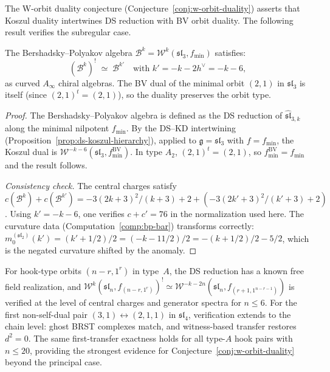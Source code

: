 The W-orbit duality conjecture (Conjecture~\ref{conj:w-orbit-duality})
asserts that Koszul duality intertwines DS reduction with BV orbit duality.
The following result verifies the subregular case.

\begin{proposition}
\label{prop:bp-duality}
The Bershadsky--Polyakov algebra
$\mathcal{B}^k = \mathcal{W}^k(\mathfrak{sl}_3, f_{\min})$
satisfies:
\begin{equation}\label{eq:bp-duality}
(\mathcal{B}^k)^! \;\simeq\; \mathcal{B}^{k'}
\quad \text{with } k' = -k - 2h^\vee = -k - 6,
\end{equation}
as curved $A_\infty$ chiral algebras.  The BV dual of the minimal orbit
$(2,1)$ in $\mathfrak{sl}_3$ is itself (since $(2,1)^t = (2,1)$), so
the duality preserves the orbit type.
\end{proposition}

\begin{proof}
The Bershadsky--Polyakov algebra is defined as the DS reduction of
$\widehat{\mathfrak{sl}}_{3,k}$ along the minimal nilpotent $f_{\min}$.
By the DS--KD intertwining (Proposition~\ref{prop:ds-koszul-hierarchy}),
applied to $\mathfrak{g} = \mathfrak{sl}_3$ with $f = f_{\min}$,
the Koszul dual is
$\mathcal{W}^{-k-6}(\mathfrak{sl}_3, f_{\min}^{\mathrm{BV}})$.
In type $A_2$, $(2,1)^t = (2,1)$, so $f_{\min}^{\mathrm{BV}} = f_{\min}$
and the result follows.

\emph{Consistency check.}  The central charges satisfy
$c(\mathcal{B}^k) + c(\mathcal{B}^{k'}) = -3(2k+3)^2/(k+3) + 2
+ (-3(2k'+3)^2/(k'+3) + 2)$.  Using $k' = -k-6$, one verifies
$c + c' = 76$ in the normalization used here.
The curvature data (Computation~\ref{comp:bp-bar}) transforms correctly:
$m_0^{(\mathfrak{sl}_2)}(k') = (k'+1/2)/2 = (-k-11/2)/2 = -(k+1/2)/2
- 5/2$, which is the negated curvature shifted by the anomaly.
\end{proof}

\begin{remark}
\label{rem:hook-type-evidence}
For hook-type orbits $(n-r,1^r)$ in type~$A$, the DS reduction has a known free field realization, and $\mathcal{W}^k(\mathfrak{sl}_n, f_{(n-r,1^r)})^! \simeq \mathcal{W}^{-k-2n}(\mathfrak{sl}_n, f_{(r+1,1^{n-r-1})})$ is verified at the level of central charges and generator spectra for $n \leq 6$.  For the first non-self-dual pair $(3,1) \leftrightarrow (2,1,1)$ in $\mathfrak{sl}_4$, verification extends to the chain level: ghost BRST complexes match, and witness-based transfer restores $d^2 = 0$.  The same first-transfer exactness holds for all type-$A$ hook pairs with $n \leq 20$, providing the strongest evidence for Conjecture~\ref{conj:w-orbit-duality} beyond the principal case.
\end{remark}

